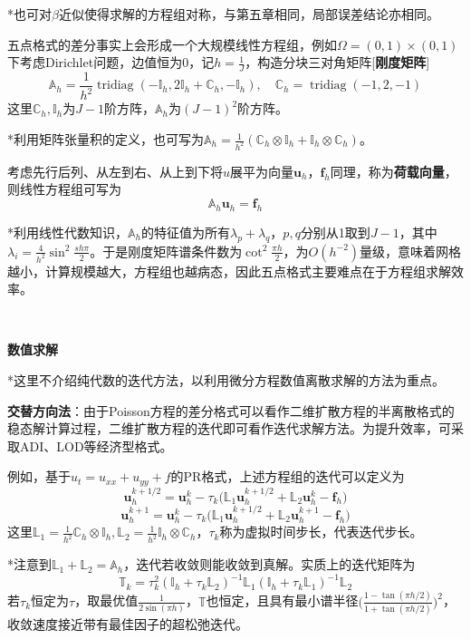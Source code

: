 \documentclass[a4paper,UTF8,fontset=windows]{ctexart}
\newcommand*{\bu}{\mathbf{u}}
\DeclareMathOperator{\tridiag}{tridiag}
\begin{document}
*也可对$\beta$近似使得求解的方程组对称，与第五章相同，局部误差结论亦相同。

五点格式的差分事实上会形成一个大规模线性方程组，例如$\Omega=(0,1)\times(0,1)$下考虑Dirichlet问题，边值恒为0，记$h=\frac{1}{J}$，构造分块三对角矩阵[\textbf{刚度矩阵}]
$$\mathbb{A}_h=\frac{1}{h^2}\tridiag(-\mathbb{I}_h,2\mathbb{I}_h+\mathbb{C}_h,-\mathbb{I}_h),\quad\mathbb{C}_h=\tridiag(-1,2,-1)$$
这里$\mathbb{C}_h,\mathbb{I}_h$为$J-1$阶方阵，$\mathbb{A}_h$为$(J-1)^2$阶方阵。

*利用矩阵张量积的定义，也可写为$\mathbb{A}_h=\frac{1}{h^2}(\mathbb{C}_h\otimes\mathbb{I}_h+\mathbb{I}_h\otimes\mathbb{C}_h)$。

考虑先行后列、从左到右、从上到下将$u$展平为向量$\bu_h$，$\mathbf{f}_h$同理，称为\textbf{荷载向量}，则线性方程组可写为
$$\mathbb{A}_h\bu_h=\mathbf{f}_h$$

*利用线性代数知识，$\mathbb{A}_h$的特征值为所有$\lambda_p+\lambda_q$，$p,q$分别从1取到$J-1$，其中$\lambda_i=\frac{4}{h^2}\sin^2\frac{sh\pi}{2}$。于是刚度矩阵谱条件数为$\cot^2\frac{\pi h}{2}$，为$O(h^{-2})$量级，意味着网格越小，计算规模越大，方程组也越病态，因此五点格式主要难点在于方程组求解效率。

\

\textbf{数值求解}

*这里不介绍纯代数的迭代方法，以利用微分方程数值离散求解的方法为重点。

\textbf{交替方向法}：由于Poisson方程的差分格式可以看作二维扩散方程的半离散格式的稳态解计算过程，二维扩散方程的迭代即可看作迭代求解方法。为提升效率，可采取ADI、LOD等经济型格式。

例如，基于$u_t=u_{xx}+u_{yy}+f$的PR格式，上述方程组的迭代可以定义为
$$\bu_h^{k+1/2}=\bu_h^k-\tau_k\big(\mathbb{L}_1\bu_h^{k+1/2}+\mathbb{L}_2\bu_h^k-\mathbf{f}_h\big)$$
$$\bu_h^{k+1}=\bu_h^k-\tau_k\big(\mathbb{L}_1\bu_h^{k+1/2}+\mathbb{L}_2\bu_h^{k+1}-\mathbf{f}_h\big)$$
这里$\mathbb{L}_1=\frac{1}{h^2}\mathbb{C}_h\otimes\mathbb{I}_h,\mathbb{L}_2=\frac{1}{h^2}\mathbb{I}_h\otimes\mathbb{C}_h$，$\tau_k$称为虚拟时间步长，代表迭代步长。

*注意到$\mathbb{L}_1+\mathbb{L}_2=\mathbb{A}_h$，迭代若收敛则能收敛到真解。实质上的迭代矩阵为
$$\mathbb{T}_k=\tau_k^2(\mathbb{I}_h+\tau_k\mathbb{L}_2)^{-1}\mathbb{L}_1(\mathbb{I}_h+\tau_k\mathbb{L}_1)^{-1}\mathbb{L}_2$$
若$\tau_k$恒定为$\tau$，取最优值$\frac{1}{2\sin(\pi h)}$，$\mathbb{T}$也恒定，且具有最小谱半径$\big(\frac{1-\tan(\pi h/2)}{1+\tan(\pi h/2)}\big)^2$，收敛速度接近带有最佳因子的超松弛迭代。
\end{document}
